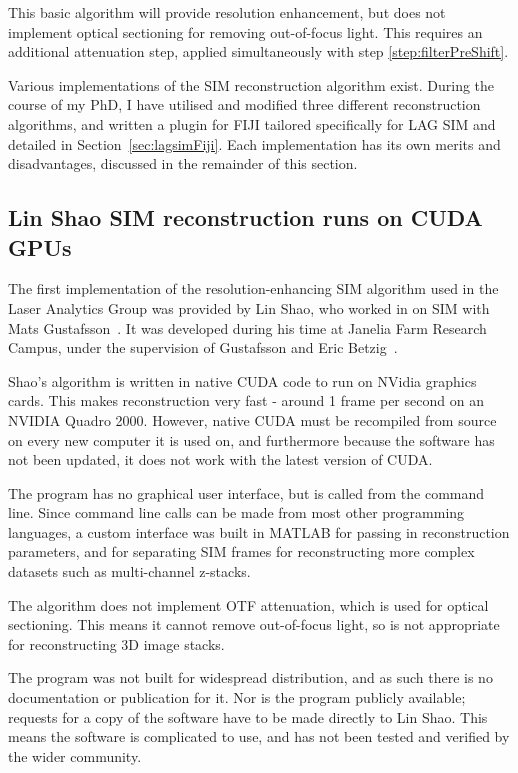 This basic algorithm will provide resolution enhancement, but does not implement optical sectioning for removing out-of-focus light.
This requires an additional attenuation step, applied simultaneously with step \ref{step:filterPreShift}. 

Various implementations of the SIM reconstruction algorithm exist.
During the course of my PhD, I have utilised and modified three different reconstruction algorithms, and written a plugin for FIJI tailored specifically for LAG SIM and detailed in Section~\ref{sec:lagsimFiji}.
Each implementation has its own merits and disadvantages, discussed in the remainder of this section.

\subsection{Lin Shao SIM reconstruction runs on CUDA GPUs}
The first implementation of the resolution-enhancing SIM algorithm used in the Laser Analytics Group was provided by Lin Shao, who worked in on SIM with Mats Gustafsson~\cite{shao2011super}.
It was developed during his time at Janelia Farm Research Campus, under the supervision of Gustafsson and Eric Betzig~\cite{beach2014nonmuscle}.

Shao's algorithm is written in native CUDA code to run on NVidia graphics cards.
This makes reconstruction very fast - around 1 frame per second on an NVIDIA Quadro 2000. 
However, native CUDA must be recompiled from source on every new computer it is used on, and furthermore because the software has not been updated, it does not work with the latest version of CUDA. 

The program has no graphical user interface, but is called from the command line. 
Since command line calls can be made from most other programming languages, a custom interface was built in MATLAB for passing in reconstruction parameters, and for separating SIM frames for reconstructing more complex datasets such as multi-channel z-stacks. 

The algorithm does not implement OTF attenuation, which is used for optical sectioning.
This means it cannot remove out-of-focus light, so is not appropriate for reconstructing 3D image stacks. 

The program was not built for widespread distribution, and as such there is no documentation or publication for it. 
Nor is the program publicly available; requests for a copy of the software have to be made directly to Lin Shao. 
This means the software is complicated to use, and has not been tested and verified by the wider community. 

